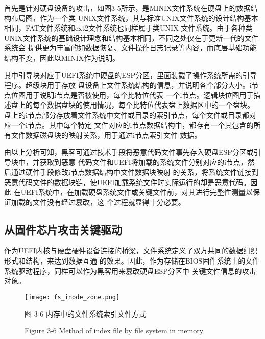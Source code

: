 \par 首先是针对硬盘设备的攻击，如图3-5所示，是MINIX文件系统在硬盘上的数据结构布局图，作为一个类
UNIX文件系统，其与标准UNIX文件系统的设计结构基本相同，FAT文件系统和ext2文件系统也同样属于类UNIX
文件系统。由于各种类UNIX文件系统的基础设计理念和结构基本相同，不同之处仅在于更新一代的文件系统会
提供更为丰富的如数据恢复、文件操作日志记录等内容，而底层基础功能结构不变，因此以MINIX作为说明。
\par 其中引导块对应于UEFI系统中硬盘的ESP分区，里面装载了操作系统所需的引导程序。超级块用于存放
盘设备上文件系统结构的信息，并说明各个部分大小。i节点位图用于说明i节点是否被使用，每个比特位代表
一个i节点。逻辑块位图用于描述盘上的每个数据盘块的使用情况，每个比特位代表盘上数据区中的一个盘块。
盘上的i节点部分存放着文件系统中文件或目录的索引节点，每个文件或目录都对应一个i节点。其中每个特定
文件对应的i节点数据结构中，都存有一个其包含的所有文件数据磁盘块的映射关系，用于通过i节点索引文件
数据。
\par 由以上分析可知，黑客可通过技术手段将恶意代码文件事先存入硬盘ESP分区或引导块中，并获取到恶意
代码文件和UEFI将加载的系统文件分别对应的i节点，然后通过硬件手段修改i节点数据结构中文件数据块映射
的关系，将系统文件链接到恶意代码文件的数据块链，使UEFI加载系统文件时实际运行的却是恶意代码。因此
在UEFI系统中，在加载硬盘系统文件或关键文件前，对其进行完整性测量以保证加载的文件没有经过篡改，这
个过程就显得十分必要。

\subsection{从固件芯片攻击关键驱动}
作为UEFI内核与硬盘硬件设备连接的桥梁，文件系统定义了双方共同的数据组织形式和结构，来达到数据互通
的效果。因此，作为存储在BIOS固件系统上的文件系统驱动程序，同样可以作为黑客用来篡改硬盘ESP分区中
关键文件信息的攻击对象。

\begin{figure}[htb]
    \label{ffs_format}
    \vspace{0cm}   
    \setlength{\abovecaptionskip}{0.3cm}  
	\centering
    \texttt{[image: fs\_inode\_zone.png]}
    \caption*{图 3-6 内存中的文件系统索引文件方式}
    \setlength{\belowcaptionskip}{-0.7cm}
    \caption*{Figure 3-6 Method of index file by file system in memory}
\end{figure}


